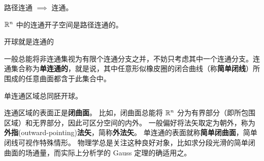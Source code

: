 \begin{remark}
    路径连通 $\implies$ 连通。
\end{remark}

\begin{eg}
    $\mathbb{R}^{n}$ 中的连通开子空间是路径连通的。
\end{eg}

开球就是连通的

一般总能将非连通集视为有限个连通分支之并，不妨只考虑其中一个连通分支。连通集合称为\textbf{单连通的}，就是说，其中任意形似橡皮圈的闭合曲线（称\textbf{简单闭线}）所围成的任意曲面都含于此集合中。

单连通区域总同胚开球。


连通区域的表面正是\textbf{闭曲面}。
比如，闭曲面总能将 $\mathbb{R}^n$ 分为有界部分（即所包围区域）和无界部分，因此可区分空间的内外。
一般偏好将法矢取定为朝外，称为\textbf{外指}(outward-pointing)\textbf{法矢}，简称\textbf{外法矢}。
单连通的表面就称\textbf{简单闭曲面}，简单闭线可视作特殊情形。
物理学总是关注这种良好对象，比如求分段光滑的简单闭曲面的场通量，而实际上分析学的 Gauss 定理的确适用之。
